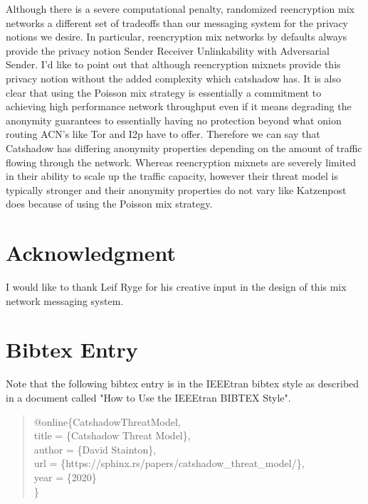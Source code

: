 \documentclass[conference]{IEEEtran}
\begin{document}
Although there is a severe computational penalty, randomized
reencryption mix networks a different set of tradeoffs than our
messaging system for the privacy notions we desire. In particular,
reencryption mix networks by defaults always provide the privacy
notion Sender Receiver Unlinkability with Adversarial Sender. I'd like
to point out that although reencryption mixnets provide this privacy
notion without the added complexity which catshadow has. It is also
clear that using the Poisson mix strategy is essentially a commitment
to achieving high performance network throughput even if it means
degrading the anonymity guarantees to essentially having no protection
beyond what onion routing ACN's like Tor and I2p have to
offer. Therefore we can say that Catshadow has differing anonymity
properties depending on the amount of traffic flowing through the
network. Whereas reencryption mixnets are severely limited in their
ability to scale up the traffic capacity, however their threat model
is typically stronger and their anonymity properties do not vary like
Katzenpost does because of using the Poisson mix strategy.

\section{Acknowledgment}
I would like to thank Leif Ryge for his creative input in the design
of this mix network messaging system.

{\footnotesize 

}


\appendices

\section{Bibtex Entry}
\label{FirstAppendix}

Note that the following bibtex entry is in the IEEEtran bibtex style
as described in a document called "How to Use the IEEEtran BIBTEX Style".
\vspace{8pt}
\begin{quote}
   @online\{CatshadowThreatModel,\\
   \hspace*{5pt} title = \{Catshadow Threat Model\},\\
   \hspace*{5pt} author = \{David Stainton\},\\
   \hspace*{5pt} url = \{https://sphinx.rs/papers/catshadow\_threat\_model/\},\\
   \hspace*{5pt} year = \{2020\}\\
   \}\\
\end{quote}
\end{document}
